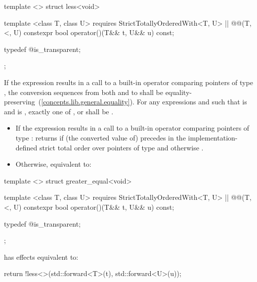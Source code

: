 %
\begin{itemdecl}
template <> struct less<void> {
  template <class T, class U>
    requires StrictTotallyOrderedWith<T, U> || @\textit{}@(T, <, U)
  constexpr bool operator()(T&& t, U&& u) const;

  typedef @\unspec@ is_transparent;
};
\end{itemdecl}

\begin{itemdescr}
\pnum
\requires
If the expression  results in a
call to a built-in operator \tcode{<} comparing pointers of type , the
conversion sequences from both  and  to  shall be
equality-preserving~(\ref{concepts.lib.general.equality}). For any expressions
 and  such that  is  and
 is , exactly one of ,
 or  shall be
.

\pnum
\effects
\begin{itemize}
\item
If the expression  results in a
call to a built-in operator \tcode{<} comparing pointers of type :
returns  if (the converted value of)  precedes  in
the implementation-defined strict total order over pointers of type 
and otherwise .

\item
Otherwise, equivalent to: 
\end{itemize}
\end{itemdescr}

%
\begin{itemdecl}
template <> struct greater_equal<void> {
  template <class T, class U>
    requires StrictTotallyOrderedWith<T, U> || @\textit{}@(T, <, U)
  constexpr bool operator()(T&& t, U&& u) const;

  typedef @\unspec@ is_transparent;
};
\end{itemdecl}

\begin{itemdescr}
\pnum
{} has effects equivalent to:
\begin{codeblock}
return !less<>{}(std::forward<T>(t), std::forward<U>(u));
\end{codeblock}
\end{itemdescr}

